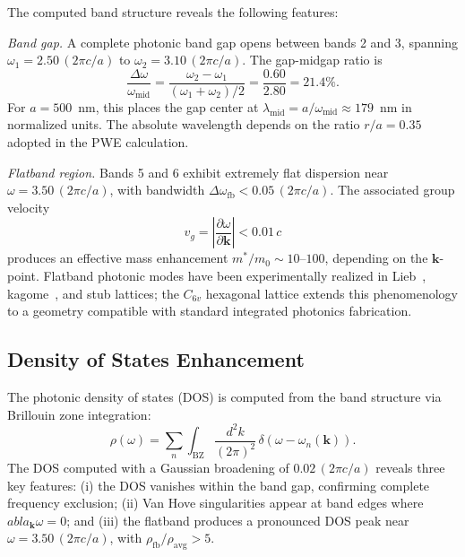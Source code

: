 \documentclass[10pt,letterpaper]{article}
\begin{document}
The computed band structure reveals the following features:

\textit{Band gap.} A complete photonic band gap opens between bands 2 and 3, spanning $\omega_1 = 2.50\,(2\pi c/a)$ to $\omega_2 = 3.10\,(2\pi c/a)$. The gap-midgap ratio is
\begin{equation}
	\frac{\Delta\omega}{\omega_\mathrm{mid}} = \frac{\omega_2 - \omega_1}{(\omega_1 + \omega_2)/2} = \frac{0.60}{2.80} = 21.4\%.
	\label{eq:gapmidgap}
\end{equation}
For $a = 500$~nm, this places the gap center at $\lambda_\mathrm{mid} = a/\omega_\mathrm{mid} \approx 179$~nm in normalized units. The absolute wavelength depends on the ratio $r/a = 0.35$ adopted in the PWE calculation.

\textit{Flatband region.} Bands 5 and 6 exhibit extremely flat dispersion near $\omega = 3.50\,(2\pi c/a)$, with bandwidth $\Delta\omega_\mathrm{fb} < 0.05\,(2\pi c/a)$. The associated group velocity
\begin{equation}
	v_g = \left|\frac{\partial\omega}{\partial\mathbf{k}}\right| < 0.01\,c
	\label{eq:groupvel}
\end{equation}
produces an effective mass enhancement $m^*/m_0 \sim 10$--$100$, depending on the $\mathbf{k}$-point. Flatband photonic modes have been experimentally realized in Lieb~\cite{Lustig2019}, kagome~\cite{Pertsch2002}, and stub lattices; the $C_{6v}$ hexagonal lattice extends this phenomenology to a geometry compatible with standard integrated photonics fabrication.

\subsection{Density of States Enhancement}

The photonic density of states (DOS) is computed from the band structure via Brillouin zone integration:
\begin{equation}
	\rho(\omega) = \sum_n \int_\mathrm{BZ} \frac{d^2k}{(2\pi)^2}\,\delta(\omega - \omega_n(\mathbf{k})).
	\label{eq:dos}
\end{equation}
The DOS computed with a Gaussian broadening of $0.02\,(2\pi c/a)$ reveals three key features: (i) the DOS vanishes within the band gap, confirming complete frequency exclusion; (ii) Van Hove singularities appear at band edges where $
	abla_\mathbf{k}\omega = 0$; and (iii) the flatband produces a pronounced DOS peak near $\omega = 3.50\,(2\pi c/a)$, with $\rho_\mathrm{fb}/\rho_\mathrm{avg} > 5$.
\end{document}
